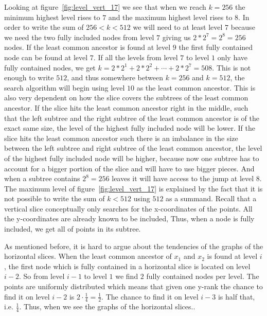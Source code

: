 Looking at figure~\ref{fig:level_vert_17} we see that when we reach $k=256$ the minimum highest level rises to $7$ and the maximum highest level rises to $8$. In order to write the sum of $256<k<512$ we will need to at least level $7$ because we need the two fully included nodes from level $7$ giving us $2*2^7 = 2^8 = 256$ nodes. If the least common ancestor is found at level $9$ the first fully contained node can be found at level $7$. If all the levels from level $7$ to level $1$ only have fully contained nodes, we get $k = 2*2^1 + 2*2^2 + \cdots + 2*2^7 = 508$. This is not enough to write $512$, and thus somewhere between $k=256$ and $k=512$, the search algorithm will begin using level $10$ as the least common ancestor. This is also very dependent on how the slice covers the subtrees of the least common ancestor. If the slice hits the least common ancestor right in the middle, such that the left subtree and the right subtree of the least common ancestor is of the exact same size, the level of the highest fully included node will be lower. If the slice hits the least common ancestor such there is an imbalance in the size between the left subtree and right subtree of the least common ancestor, the level of the highest fully included node will be higher, because now one subtree has to account for a bigger portion of the slice and will have to use bigger pieces. And when a subtree contains $2^8 = 256$ leaves it will have access to the jump at level $8$. The maximum level of figure~\ref{fig:level_vert_17} is explained by the fact that it is not possible to write the sum of $k<512$ using $512$ as a summand. Recall that a vertical slice conceptually only searches for the x-coordinates of the points. All the y-coordinates are already known to be included, Thus, when a node is fully included, we get all of points in its subtree.   

As mentioned before, it is hard to argue about the tendencies of the graphs of the horizontal slices. When the least common ancestor of $x_1$ and $x_2$ is found at level $i$, the first node which is fully contained in a horizontal slice is located on level $i-2$. So from level $i-1$ to level $1$ we find $2$ fully contained nodes per level. The points are uniformly distributed which means that given one y-rank the chance to find it on level $i-2$ is $2\cdot\frac{1}{4} = \frac{1}{2}$. The chance to find it on level $i-3$ is half that, i.e. $\frac{1}{4}$. Thus, when we see the graphs of the horizontal slices..

